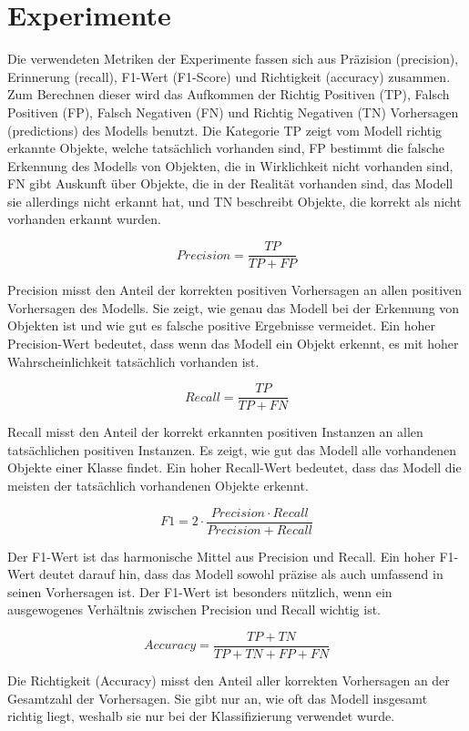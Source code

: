 \chapter{Experimente}
\label{ch:experimente}

Die verwendeten Metriken der Experimente fassen sich aus Präzision (precision), Erinnerung (recall), F1-Wert (F1-Score) und Richtigkeit (accuracy) zusammen. Zum Berechnen dieser wird das Aufkommen der Richtig Positiven (TP), Falsch Positiven (FP), Falsch Negativen (FN) und Richtig Negativen (TN) Vorhersagen (predictions) des Modells benutzt. Die Kategorie TP zeigt vom Modell richtig erkannte Objekte, welche tatsächlich vorhanden sind, FP bestimmt die falsche Erkennung des Modells von Objekten, die in Wirklichkeit nicht vorhanden sind, FN gibt Auskunft über Objekte, die in der Realität vorhanden sind, das Modell sie allerdings nicht erkannt hat, und TN beschreibt Objekte, die korrekt als nicht vorhanden erkannt wurden.

\[Precision = \frac{TP}{TP + FP}\]

Precision misst den Anteil der korrekten positiven Vorhersagen an allen positiven Vorhersagen des Modells. Sie zeigt, wie genau das Modell bei der Erkennung von Objekten ist und wie gut es falsche positive Ergebnisse vermeidet. Ein hoher Precision-Wert bedeutet, dass wenn das Modell ein Objekt erkennt, es mit hoher Wahrscheinlichkeit tatsächlich vorhanden ist.

\[Recall = \frac{TP}{TP + FN}\]

Recall misst den Anteil der korrekt erkannten positiven Instanzen an allen tatsächlichen positiven Instanzen. Es zeigt, wie gut das Modell alle vorhandenen Objekte einer Klasse findet. Ein hoher Recall-Wert bedeutet, dass das Modell die meisten der tatsächlich vorhandenen Objekte erkennt.

\[F1 = 2 \cdot \frac{Precision \cdot Recall}{Precision + Recall}\]

Der F1-Wert ist das harmonische Mittel aus Precision und Recall. Ein hoher F1-Wert deutet darauf hin, dass das Modell sowohl präzise als auch umfassend in seinen Vorhersagen ist. Der F1-Wert ist besonders nützlich, wenn ein ausgewogenes Verhältnis zwischen Precision und Recall wichtig ist.

\[Accuracy = \frac{TP + TN}{TP + TN + FP + FN}\]

Die Richtigkeit (Accuracy) misst den Anteil aller korrekten Vorhersagen an der Gesamtzahl der Vorhersagen. Sie gibt nur an, wie oft das Modell insgesamt richtig liegt, weshalb sie nur bei der Klassifizierung verwendet wurde.

